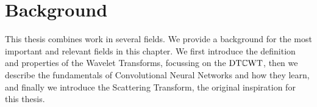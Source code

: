 \chapter{Background}\label{ch:litreview}
\def \path {litreview/}
\def \imgpath {litreview/images}

This thesis combines work in several fields. We provide a background for the
most important and relevant fields in this chapter. We first introduce the
definition and properties of the Wavelet Transforms, focussing on the $\mathrm{DT}\mathbb{C}\mathrm{WT}$,
then we describe the fundamentals of Convolutional Neural Networks and how they
learn, and finally we introduce the Scattering Transform, the original
inspiration for this thesis.






